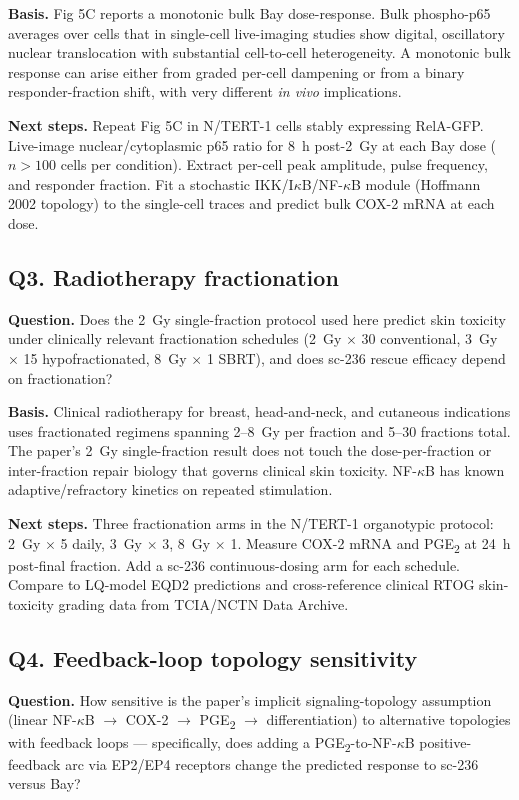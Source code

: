 \textbf{Basis.} Fig 5C reports a monotonic bulk Bay dose-response. Bulk phospho-p65 averages over cells that in single-cell live-imaging studies show digital, oscillatory nuclear translocation with substantial cell-to-cell heterogeneity. A monotonic bulk response can arise either from graded per-cell dampening or from a binary responder-fraction shift, with very different \emph{in vivo} implications.

\textbf{Next steps.} Repeat Fig 5C in N/TERT-1 cells stably expressing RelA-GFP. Live-image nuclear/cytoplasmic p65 ratio for 8~h post-2~Gy at each Bay dose ($n > 100$ cells per condition). Extract per-cell peak amplitude, pulse frequency, and responder fraction. Fit a stochastic IKK/I$\kappa$B/NF-$\kappa$B module (Hoffmann 2002 topology) to the single-cell traces and predict bulk COX-2 mRNA at each dose.

\subsection*{Q3. Radiotherapy fractionation}
\textbf{Question.} Does the 2~Gy single-fraction protocol used here predict skin toxicity under clinically relevant fractionation schedules (2~Gy $\times$ 30 conventional, 3~Gy $\times$ 15 hypofractionated, 8~Gy $\times$ 1 SBRT), and does sc-236 rescue efficacy depend on fractionation?

\textbf{Basis.} Clinical radiotherapy for breast, head-and-neck, and cutaneous indications uses fractionated regimens spanning 2--8~Gy per fraction and 5--30 fractions total. The paper's 2~Gy single-fraction result does not touch the dose-per-fraction or inter-fraction repair biology that governs clinical skin toxicity. NF-$\kappa$B has known adaptive/refractory kinetics on repeated stimulation.

\textbf{Next steps.} Three fractionation arms in the N/TERT-1 organotypic protocol: 2~Gy $\times$ 5 daily, 3~Gy $\times$ 3, 8~Gy $\times$ 1. Measure COX-2 mRNA and PGE\textsubscript{2} at 24~h post-final fraction. Add a sc-236 continuous-dosing arm for each schedule. Compare to LQ-model EQD2 predictions and cross-reference clinical RTOG skin-toxicity grading data from TCIA/NCTN Data Archive.

\subsection*{Q4. Feedback-loop topology sensitivity}
\textbf{Question.} How sensitive is the paper's implicit signaling-topology assumption (linear NF-$\kappa$B $\to$ COX-2 $\to$ PGE\textsubscript{2} $\to$ differentiation) to alternative topologies with feedback loops --- specifically, does adding a PGE\textsubscript{2}-to-NF-$\kappa$B positive-feedback arc via EP2/EP4 receptors change the predicted response to sc-236 versus Bay?

